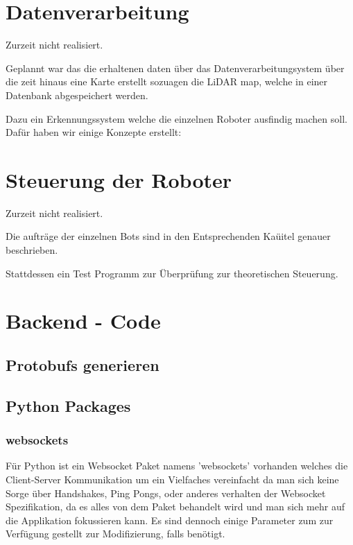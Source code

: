 \section{Datenverarbeitung}
Zurzeit nicht realisiert.

Geplannt war das die erhaltenen daten über das Datenverarbeitungsystem 
über die zeit hinaus eine Karte erstellt sozuagen die LiDAR map,
welche in einer Datenbank abgespeichert werden.

Dazu ein Erkennungssystem welche die einzelnen Roboter ausfindig machen soll.
Dafür haben wir einige Konzepte erstellt:

\section{Steuerung der Roboter}
\label{subsec:backend_robot_detection}
Zurzeit nicht realisiert.

Die aufträge der einzelnen Bots sind in den Entsprechenden Kaüitel genauer beschrieben.

Stattdessen ein Test Programm zur Überprüfung zur theoretischen Steuerung.


\section{Backend - Code}

\subsection{Protobufs generieren}

\subsection{Python Packages}
\subsubsection{websockets}
Für Python ist ein Websocket Paket namens 'websockets' vorhanden welches die Client-Server Kommunikation
um ein Vielfaches vereinfacht da man sich keine Sorge über Handshakes, Ping Pongs, oder anderes verhalten
der Websocket Spezifikation, da es alles von dem Paket behandelt wird 
und man sich mehr auf die Applikation fokussieren kann. 
Es sind dennoch einige Parameter zum zur Verfügung gestellt zur Modifizierung, falls benötigt.


